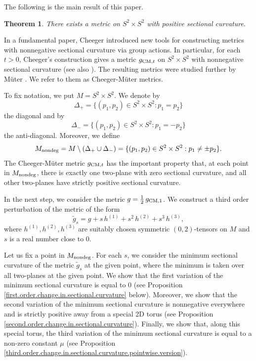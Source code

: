 \documentclass[11pt]{amsart}
\newtheorem{theorem}{Theorem}[section]
\theoremstyle{definition}
\begin{document}
The following is the main result of this paper.

\begin{theorem}
\label{main.theorem}
There exists a metric on $S^2 \times S^2$ with positive sectional curvature. 
\end{theorem}

In a fundamental paper, Cheeger \cite{Cheeger} introduced new tools for constructing metrics with nonnegative sectional curvature via group actions. In particular, for each $t > 0$, Cheeger's construction gives a metric $g_{\text{\rm CM},t}$ on $S^2 \times S^2$ with nonnegative sectional curvature (see also \cite{Bourguignon}). The resulting metrics were studied further by M\"uter \cite{Mueter}. We refer to them as Cheeger-M\"uter metrics. 

To fix notation, we put $M = S^2 \times S^2$. We denote by 
\[\Delta_+ = \{(p_1,p_2) \in S^2 \times S^2: p_1 = p_2\}\] 
the diagonal and by 
\[\Delta_- = \{(p_1,p_2) \in S^2 \times S^2: p_1 = -p_2\}\] 
the anti-diagonal. Moreover, we define 
\[M_{\text{\rm nondeg}} = M \setminus (\Delta_+ \cup \Delta_-) = \{(p_1,p_2) \in S^2 \times S^2: p_1 \neq \pm p_2\}.\] 
The Cheeger-M\"uter metric $g_{\text{\rm CM},t}$ has the important property that, at each point in $M_{\text{\rm nondeg}}$, there is exactly one two-plane with zero sectional curvature, and all other two-planes have strictly positive sectional curvature.

In the next step, we consider the metric $g = \frac{1}{2} \, g_{\text{\rm CM},1}$. We construct a third order perturbation of the metric of the form 
\[\tilde{g}_s = g + s \, h^{(1)} + s^2 \, h^{(2)} + s^3 \, h^{(3)},\] 
where $h^{(1)}, h^{(2)}, h^{(3)}$ are suitably chosen symmetric $(0,2)$-tensors on $M$ and $s$ is a real number close to $0$. 

Let us fix a point in $M_{\text{\rm nondeg}}$. For each $s$, we consider the minimum sectional curvature of the metric $\tilde{g}_s$ at the given point, where the minimum is taken over all two-planes at the given point. We show that the first variation of the minimum sectional curvature is equal to $0$ (see Proposition \ref{first.order.change.in.sectional.curvature} below). Moreover, we show that the second variation of the minimum sectional curvature is nonnegative everywhere and is strictly positive away from a special 2D torus (see Proposition \ref{second.order.change.in.sectional.curvature}). Finally, we show that, along this special torus, the third variation of the minimum sectional curvature is equal to a non-zero constant $\mu$ (see Proposition \ref{third.order.change.in.sectional.curvature.pointwise.version}). 
\end{document}
